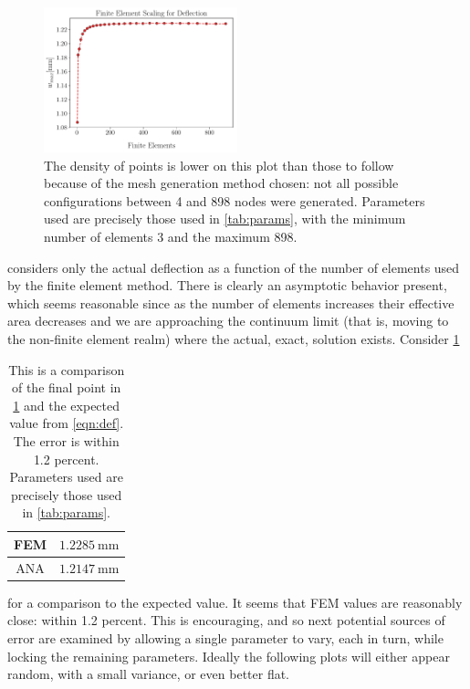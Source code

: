 \documentclass[12pt,times,twocolumn,3p]{elsarticle}
\begin{document}
\begin{figure}[h]
    \centering
    \includegraphics[width=0.5\textwidth]{./ve_scaling.pdf}
    \caption{The density of points is lower on this plot than those to follow because
    of the mesh generation method chosen: not all possible configurations between 4
    and 898 nodes were generated. Parameters used are precisely those used in
    \cref{tab:params}, with the minimum number of elements 3 and the maximum 898.}
    \label{fig:ve}
\end{figure}
considers only the actual deflection as a function of the number of elements used
by the finite element method. There is clearly an asymptotic behavior present, which
seems reasonable since as the number of elements increases their effective area decreases
and we are approaching the continuum limit (that is, moving to the non-finite element
realm) where the actual, exact, solution exists. Consider \cref{tab:ve}
\begin{table}[ht]
    \centering
    \begin{tabular}{ ||c|l|| }
        \hline
        FEM & $\SI{1.2285}{\milli\meter}$ \\
        \hline
        ANA & $\SI{1.2147}{\milli\meter}$ \\
        \hline
    \end{tabular}
    \caption{This is a comparison of the final point in \cref{fig:ve} and the expected
    value from \cref{eqn:def}. The error is within 1.2 percent. Parameters used are
    precisely those used in \cref{tab:params}.}
    \label{tab:ve}
\end{table}
for a comparison to the expected value. It seems that FEM values are reasonably close:
within 1.2 percent. This is encouraging, and so next potential sources of error are
examined by allowing a single parameter to vary, each in turn, while locking the
remaining parameters. Ideally the following plots will either appear random, with a
small variance, or even better flat.
\end{document}
